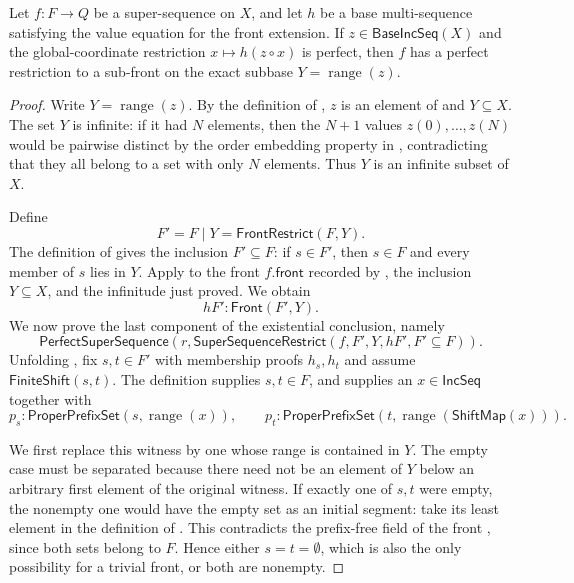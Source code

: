 \begin{lemma}
Let $f:F\to Q$ be a super-sequence on $X$, and let $h$ be a base
multi-sequence satisfying the value equation for the front extension.  If
$z\in\mathsf{BaseIncSeq}(X)$ and the global-coordinate restriction
$x\mapsto h(z\circ x)$ is perfect, then $f$ has a perfect restriction to a
sub-front on the exact subbase $Y=\operatorname{range}(z)$.
\end{lemma}
\begin{proof}
Write $Y=\operatorname{range}(z)$.  By the definition of
, $z$ is an element of  and
$Y\subseteq X$.  The set $Y$ is infinite: if it had $N$ elements, then the
$N+1$ values $z(0),\ldots,z(N)$ would be pairwise distinct by the order
embedding property in , contradicting that they all belong
to a set with only $N$ elements.  Thus $Y$ is an infinite subset of $X$.

Define
\[
 F'=F\mathbin{|}Y=\mathsf{FrontRestrict}(F,Y).
\]
The definition of  gives the inclusion
$F'\subseteq F$: if $s\in F'$, then $s\in F$ and every member of $s$ lies
in $Y$.  Apply  to the front
$f.\mathsf{front}$ recorded by , the inclusion
$Y\subseteq X$, and the infinitude just proved.  We obtain
\[
 hF':\mathsf{Front}(F',Y).
\]
We now prove the last component of the existential conclusion, namely
\[
 \mathsf{PerfectSuperSequence}(r,
   \mathsf{SuperSequenceRestrict}(f,F',Y,hF',F'\subseteq F)).
\]
Unfolding , fix $s,t\in F'$ with membership
proofs $h_s,h_t$ and assume
$\mathsf{FiniteShift}(s,t)$.  The definition 
supplies $s,t\in F$, and  supplies an
$x\in\mathsf{IncSeq}$ together with
\[
 p_s:\mathsf{ProperPrefixSet}(s,\operatorname{range}(x)),\qquad
 p_t:\mathsf{ProperPrefixSet}(t,\operatorname{range}(\mathsf{ShiftMap}(x))).
 \tag{1}
\]

We first replace this witness by one whose range is contained in $Y$.  The
empty case must be separated because there need not be an element of $Y$
below an arbitrary first element of the original witness.  If exactly one
of $s,t$ were empty, the nonempty one would have the empty set as an
initial segment: take its least element in the definition of
.  This contradicts the prefix-free field of the
front , since both sets belong to $F$.  Hence either
$s=t=\emptyset$, which is also the only possibility for a trivial front,
or both are nonempty.


\end{proof}
